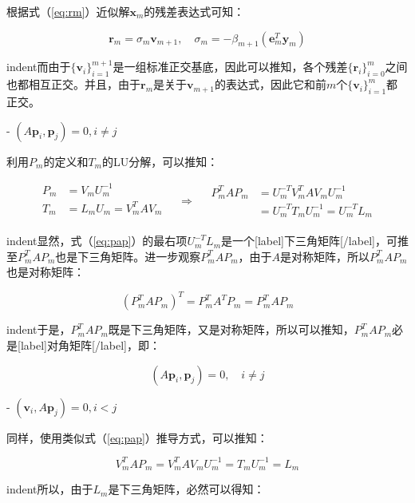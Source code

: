 \documentclass[UTF8,nofonts]{ctexart}
\begin{document}
根据式（\ref{eq:rm}）近似解$\boldsymbol{x}_m$的残差表达式可知：

\begin{equation}
\label{eq:rsv}
\boldsymbol{r}_m=\sigma_m\boldsymbol{v}_{m+1},\quad\sigma_m=-\beta_{m+1}\left(\boldsymbol{e}^T_m\boldsymbol{y}_m\right)
\end{equation}

indent而由于$\{\boldsymbol{v}_i\}_{i=1}^{m+1}$是一组标准正交基底，因此可以推知，各个残差$\{\boldsymbol{r}_i\}_{i=0}^{m}$之间也都相互正交。并且，由于$\boldsymbol{r}_m$是关于$\boldsymbol{v}_{m+1}$的表达式，因此它和前$m$个$\{\boldsymbol{v}_i\}_{i=1}^m$都正交。

- $\left(A\boldsymbol{p}_i,\boldsymbol{p}_j\right)=0,i \neq j$

利用$P_m$的定义和$T_m$的LU分解，可以推知：

\begin{equation}
\label{eq:pap}
\begin{aligned}
P_m&=V_mU_m^{-1} \\
T_m&=L_mU_m=V_m^TAV_m \\
\end{aligned}\quad\Longrightarrow\quad
\begin{aligned}
P_m^TAP_m &= U_m^{-T}V_m^TAV_mU_m^{-1} \\
&= U_m^{-T}T_mU_m^{-1}=U_m^{-T}L_m
\end{aligned}
\end{equation}

indent显然，式（\ref{eq:pap}）的最右项$U_m^{-T}L_m$是一个[label]下三角矩阵[/label]，可推至$P_m^TAP_m$也是下三角矩阵。进一步观察$P_m^TAP_m$，由于$A$是对称矩阵，所以$P_m^TAP_m$也是对称矩阵：

\[(P_m^TAP_m)^T=P_m^TA^TP_m=P_m^TAP_m\]

indent于是，$P_m^TAP_m$既是下三角矩阵，又是对称矩阵，所以可以推知，$P_m^TAP_m$必是[label]对角矩阵[/label]，即：

\begin{equation}
\label{eq:pipj}
\left(A\boldsymbol{p}_i,\boldsymbol{p}_j\right)=0,\quad i \neq j
\end{equation}

- $\left(\boldsymbol{v}_i,A\boldsymbol{p}_j\right)=0,i<j$

同样，使用类似式（\ref{eq:pap}）推导方式，可以推知：

\[V_m^TAP_m=V_m^TAV_mU_m^{-1}=T_mU_m^{-1}=L_m\]

indent所以，由于$L_m$是下三角矩阵，必然可以得知：
\end{document}
